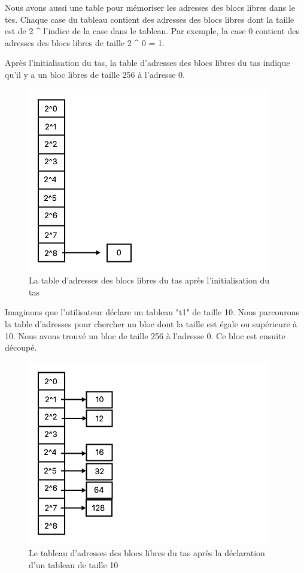 \documentclass[a4paper,12pt]{report}
\begin{document}
Nous avons aussi une table pour mémoriser les adresses des blocs libres dans le tes. Chaque case du tableau contient des adresses des blocs libres dont la taille est de 2 \^{} l'indice de la case dans le tableau. Par exemple, la case 0 contient des adresses des blocs libres de taille 2 \^{} 0 = 1.

Après l'initialisation du tas, la table d'adresses des blocs libres du tas indique qu'il y a un bloc libres de taille 256 à l'adresse 0.

\begin{figure}[H]
\begin{center}
	\includegraphics[scale=0.5]{adress}
	\caption{La table d'adresses des blocs libres du tas après l'initialisation du tas}
\end{center}
\end{figure}

Imaginons que l'utilisateur déclare un tableau "t1" de taille 10. Nous parcourons la table d'adresses pour chercher un bloc dont la taille est égale ou supérieure à 10. Nous avons trouvé un bloc de taille 256 à l'adresse 0. Ce bloc est ensuite découpé.

\begin{figure}[H]
\begin{center}
	\includegraphics[scale=0.5]{adress2}
	\caption{Le tableau d'adresses des blocs libres du tas après la déclaration d'un tableau de taille 10}
\end{center}
\end{figure}
\end{document}
